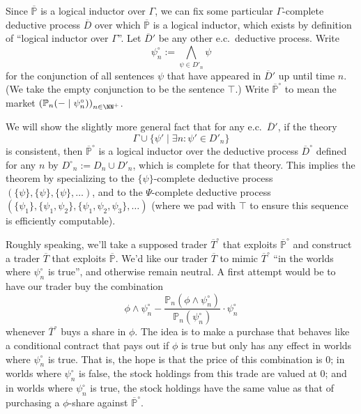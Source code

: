 \documentclass[authordate,onecolumn,noenvironments]{miri-tech-article}
\numberwithin{equation}{subsection}
\newcommand{\seq}[1]{{\overline{#1}}}
\newcommand{\any}{-}
\newcommand{\ec}[1][\ ]{e.c.#1}
\newcommand{\li}{logical inductor}
\newcommand{\trade}{T}%
\newcommand{\Trader}{\seq{\trade}} %
\newcommand{\BelState}{\mathbb{P}}
\newcommand{\pt}{\BelState}
\newcommand{\MP}{\seq{\pt}}
\newcommand{\dt}{D}
\newcommand{\DP}{\seq{\dt}}
\newcommand{\Theory}{\Gamma}
\begin{document}
\newcommand{\symb}{\circ}
\newcommand{\altDP}{{\DP^{\symb}}}
\newcommand{\altdt}{{\dt^{\symb}}}
\newcommand{\altpsi}[1]{{\psi^{\symb}_{#1}}}
\newcommand{\altMP}{{\MP^{\symb}}}
\newcommand{\altpt}{{\pt^{\symb}}}


\restatescon*

  Since  $\MP$ is a \li{} over $\Theory$, we can fix some particular $\Theory$-complete deductive process $\DP$ over which $\MP$ is a \li{}, which exists by definition of ``\li{} over $\Theory$''. 
Let $\DP'$ be any other \ec deductive process.
Write 
%
\[ \altpsi{n} := \bigwedge_{\psi \in \dt'_n} \psi  \]
%
for the conjunction of all sentences $\psi$ that have appeared in $\DP'$ up until time $n$. (We take the empty conjunction to be the sentence
$\top$.) 
Write $\altMP$ to mean the market 
$\left(  \pt_n(\any \mid  \altpsi{n}) \right)_{n \in \NN^+}$. 


We will show the slightly more general fact that for any \ec $\DP'$, if the theory \[  \Theory \cup \{\psi'
\mid \exists n: \psi' \in \dt'_n \} \] is consistent, then $\altMP$
  is a \li{} over the deductive process $\altDP$ defined for any $n$ by $\altdt_n := \dt_n \cup \dt'_n$, which is complete for that theory. 
  This implies the theorem by specializing to the $\{\psi\}$-complete deductive process
  $(\{\psi\},\{\psi\},\{\psi\},\ldots)$, and to the $\Psi$-complete deductive process
$(\{\psi_1\},\{\psi_1,\psi_2\},\{\psi_1,\psi_2,\psi_3\},\ldots)$ (where we pad with $\top$ to ensure this sequence is efficiently computable). 


Roughly speaking, we'll take a supposed trader $\Trader^\symb$ that exploits $\altMP$ and construct a trader $\Trader$ that exploits $\MP$.
We'd like our trader $\Trader$ to mimic $\Trader^\symb$ ``in the worlds where $\altpsi{n}$ is true'', and otherwise remain neutral. A first attempt
would be to have our trader buy the combination
%
\[
  \phi \wedge \altpsi{n} - \frac{\pt_n(\phi \wedge \altpsi{n})}{\pt_n(\altpsi{n})} \cdot \altpsi{n}
\]
%
whenever $\Trader^\symb$ buys a share in $\phi$. 
The idea is to make a purchase that behaves like a conditional contract that pays out if $\phi$ is true but only has any effect in worlds where  $\altpsi{n}$
is true.
That is, the hope is that the price of this combination is 0; in worlds where $\altpsi{n}$
 is false, the stock holdings from this trade are valued at 0; and in worlds where $\altpsi{n}$
 is true, the stock holdings have the same value as that of  purchasing a $\phi$-share against $\altMP$. 
\end{document}
